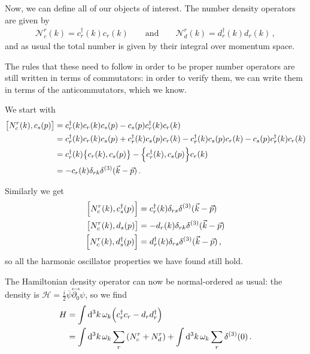 \documentclass[main.tex]{subfiles}
\begin{document}

Now, we can define all of our objects of interest. The number density operators are given by
%
\begin{align}
\mathscr{N}^{r}_{c} (k) = c ^\dag_{r} (k) c_r (k) \qquad \text{and} \qquad
\mathscr{N}^{r}_{d} (k) = d ^\dag_{r} (k) d_r (k)
\,,
\end{align}
%
and as usual the total number is given by their integral over momentum space. 

The rules that these need to follow in order to be proper number operators are still written in terms of commutators: in order to verify them, we can write them in terms of the anticommutators, which we know. 

We start with 
%
\begin{align}
\qty[N_c^{r} (k), c_s (p)] &= c_r ^\dag (k) c_r (k) c_s (p) -  c_s (p) c_r ^\dag (k) c_r (k)  \\
&= c_r ^\dag (k) c_r (k) c_s (p) + c_r ^\dag (k) c_s (p) c_r (k)
- c_r ^\dag (k) c_s (p) c_r (k) -  c_s (p) c_r ^\dag (k) c_r (k)  \\
&= c_r ^\dag (k) \qty{c_r (k), c_s (p)} - \qty{c_r ^\dag (k), c_s (p)} c_r (k)  \\
&= - c_r (k) \delta_{rk} \delta^{(3)} (\vec{k} - \vec{p})
\,.
\end{align}

Similarly we get 
%
\begin{align}
\qty[N_c^{r} (k), c_s ^\dag (p)] &= c_r ^\dag (k) \delta_{rs} \delta^{(3)} (\vec{k} - \vec{p})  \\
\qty[N_c^{r} (k), d_s (p)] &= - d_r (k) \delta_{rk} \delta^{(3)} (\vec{k} - \vec{p}) \\
\qty[N_c^{r} (k), d_s ^\dag (p)] &= d_r ^\dag (k) \delta_{rs} \delta^{(3)} (\vec{k} - \vec{p}) 
\,,
\end{align}
%
so all the harmonic oscillator properties we have found still hold. 

The Hamiltonian density operator can now be normal-ordered as usual: the density is \(\mathscr{H} = \frac{i}{2} \overline{\psi} \overset{\leftrightarrow}{\partial_0 } \psi \), so we find
%
\begin{align}
H &= \int \dd[3]{k} \omega_{k} \qty(c_r ^\dag c_r - d_r d_r ^\dag)  \\
&= \int \dd[3]{k} \omega_{k} \sum _{r} \qty(N_c^{r} + N_d^{r}) + \int \dd[3]{k} \omega_{k} \sum_{r} \delta^{(3)} (0)
\,.
\end{align}
\end{document}
